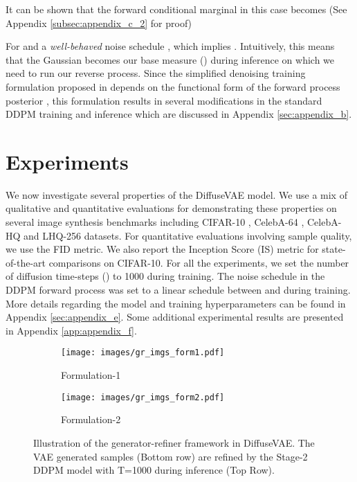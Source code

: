 \documentclass[10pt]{article} \usepackage[accepted]{tmlr}
\begin{document}
It can be shown that the forward conditional marginal in this case becomes (See Appendix \ref{subsec:appendix_c_2} for proof)

For  and a \textit{well-behaved} noise schedule ,  which implies . Intuitively, this means that the Gaussian  becomes our base measure () during inference on which we need to run our reverse process. Since the simplified denoising training formulation proposed in \citep{ho2020denoising} depends on the functional form of the forward process posterior , this formulation results in several modifications in the standard DDPM training and inference which are discussed in Appendix \ref{sec:appendix_b}.



\section{Experiments}
\label{sec:experiments}



We now investigate several properties of the DiffuseVAE model. We use a mix of qualitative and quantitative evaluations for demonstrating these properties on several image synthesis benchmarks including CIFAR-10 \citep{krizhevsky2009learning}, CelebA-64 \citep{liu2015faceattributes}, CelebA-HQ \citep{karras2018progressive} and LHQ-256 \citep{alis} datasets. For quantitative evaluations involving sample quality, we use the FID \citep{heusel2018gans} metric. We also report the Inception Score (IS) metric \citep{Salimans2016ImprovedTF} for state-of-the-art comparisons on CIFAR-10. For all the experiments, we set the number of diffusion time-steps () to 1000 during training. The noise schedule in the DDPM forward process was set to a linear schedule between  and  during training. More details regarding the model and training hyperparameters can be found in Appendix \ref{sec:appendix_e}. Some additional experimental results are presented in Appendix \ref{app:appendix_f}.
\begin{figure*}
  \centering
  \begin{subfigure}{0.49\linewidth}
  \centering
    \texttt{[image: images/gr\_imgs\_form1.pdf]}
  \caption{Formulation-1}
  \label{fig:gr_form1}
  \end{subfigure}
  \begin{subfigure}{0.49\linewidth}
  \centering
    \texttt{[image: images/gr\_imgs\_form2.pdf]}
    \caption{Formulation-2}
    \label{fig:gr_form2}
  \end{subfigure}
  \caption{Illustration of the generator-refiner framework in DiffuseVAE. The VAE generated samples (Bottom row) are refined by the Stage-2 DDPM model with T=1000 during inference (Top Row).}
  \label{fig:gr}
\end{figure*}
\end{document}
